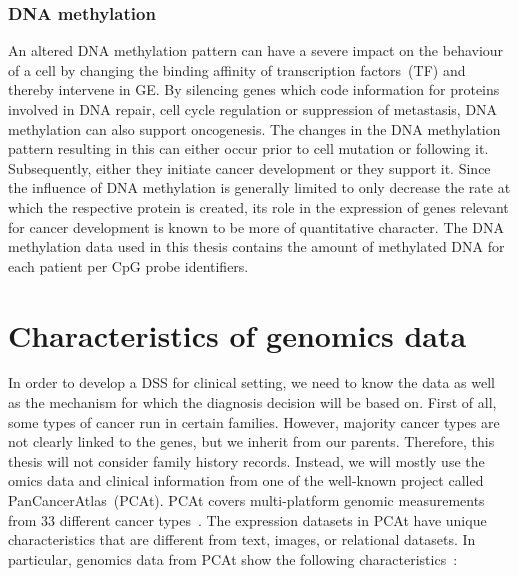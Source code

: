 \subsubsection{DNA methylation}
An altered DNA methylation pattern can have a severe impact on the behaviour of a cell by changing the binding affinity of transcription factors~(TF) and thereby intervene in GE. By silencing genes which code information for proteins involved in DNA repair, cell cycle regulation or suppression of metastasis, DNA methylation can also support oncogenesis. The changes in the DNA methylation pattern resulting in this can either occur prior to cell mutation or following it. Subsequently, either they initiate cancer development or they support it. Since the influence of DNA methylation is generally limited to only decrease the rate at which the respective protein is created, its role in the expression of genes relevant for cancer development is known to be more of quantitative character. The DNA methylation data used in this thesis contains the amount of methylated DNA for each patient per CpG probe identifiers. 



\section{Characteristics of genomics data}
In order to develop a DSS for clinical setting, we need to know the data as well as the mechanism for which the diagnosis decision will be based on. First of all, some types of cancer run in certain families. However, majority cancer types are not clearly linked to the genes, but we inherit from our parents. Therefore, this thesis will not consider family history records. Instead, we will mostly use the omics data and clinical information from one of the well-known project called PanCancerAtlas~(PCAt). PCAt covers multi-platform genomic measurements from 33 different cancer types~\cite{pancan}. 
The expression datasets in PCAt have unique characteristics that are different from text, images, or relational datasets. In particular, genomics data from PCAt show the following characteristics~\cite{lu2003cancer}:

